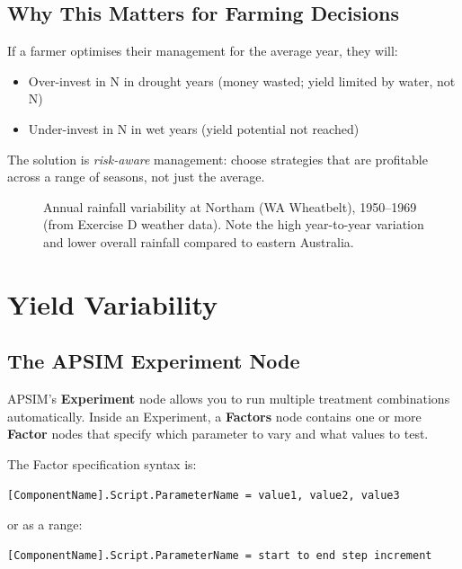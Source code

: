 \subsection{Why This Matters for Farming Decisions}

If a farmer optimises their management for the average year, they will:
\begin{itemize}
  \item Over-invest in N in drought years (money wasted; yield limited by water, not N)
  \item Under-invest in N in wet years (yield potential not reached)
\end{itemize}

The solution is \emph{risk-aware} management: choose strategies that are profitable across a range of seasons, not just the average.

\begin{figure}[H]
  \centering
  \caption{Annual rainfall variability at Northam (WA Wheatbelt), 1950--1969 (from Exercise D weather data). Note the high year-to-year variation and lower overall rainfall compared to eastern Australia.}
  \label{fig:rainfall-variability}
\end{figure}

\section{Yield Variability}

\subsection{The APSIM Experiment Node}

APSIM's \textbf{Experiment} node allows you to run multiple treatment combinations automatically. Inside an Experiment, a \textbf{Factors} node contains one or more \textbf{Factor} nodes that specify which parameter to vary and what values to test.

The Factor specification syntax is:
\begin{verbatim}
[ComponentName].Script.ParameterName = value1, value2, value3
\end{verbatim}
or as a range:
\begin{verbatim}
[ComponentName].Script.ParameterName = start to end step increment
\end{verbatim}

